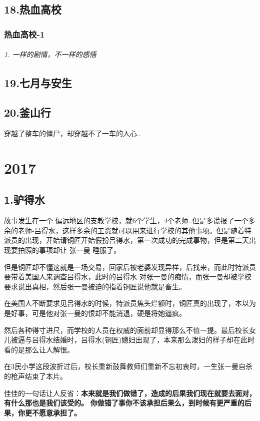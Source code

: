 \documentclass[UTF8,a4paper,8pt]{ctexbook}
\begin{document}
	\newpage
	\section*{18.热血高校 }
		\subsection*{热血高校-1}
			\subparagraph{1. 一样的剧情，不一样的感悟}
			

	\newpage
	\section*{19.七月与安生 }
	
	\newpage
	\section*{20.釜山行 }
		穿越了整车的僵尸，却穿越不了一车的人心..
	
\chapter{2017}
	\section*{1.驴得水}
		故事发生在一个 偏远地区的支教学校，就6个学生，4个老师..但是多谎报了一个多余的老师-吕得水，这样多余的工资就可以用来进行学校的其他事项。但是随着特派员的出现，开始请铜匠开始假扮吕得水，第一次成功的完成事物，但是第二天出现要拍照的事项却让 张一曼 睡服了。
		
		但是铜匠却不懂这就是一场交易，回家后被老婆发现异样，后找来，而此时特派员要带着美国人来调查吕得水，此时的吕得水 对张一曼的痴情，而张一曼却被学校要求说出真相，然后张一曼被迫的指着铜匠说他就是畜生。
		
		在美国人不断要求见吕得水的时候，特派员焦头烂额时，铜匠真的出现了，本以为是好事，可是他对张一曼的恨却不能消退，硬是将她逼疯。
		
		然后各种得寸进尺，而学校的人员在权威的面前却显得那么不值一提。最后校长女儿被逼与吕得水结婚时，吕得水(铜匠)媳妇出现了，本来那么泼妇的样子却在此时看的是那么让人解恨。
		
		在3民小学这段波折过后，校长重新鼓舞教师们重新不忘初衷时，一生张一曼自杀的枪声结束了本片。
		
		佳佳的一句话让人反省：\textbf{本来就是我们做错了，造成的后果我们现在就要去面对，有什么那也是我们该受的。}
		\textbf{你做错了事你不该承担后果么，到时候有更严重的后果，你更不愿意承担了。}
		
\end{document}
